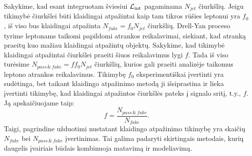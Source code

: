 \documentclass[a4paper, 12pt, oneside]{article}
\newcommand{\Lumi}{{\cal L}_\mathrm{int}}
\newlength\q
\begin{document}
Sakykime, kad esant integruotam šviesiui $\Lumi$ pagaminama $N_{jet}$ čiurkšlių.
Jeigu tikimybė čiurkšlei būti klaidingai atpažintai kaip tam tikros rūšies leptonui yra $f_0$, iš viso bus klaidingai atpažinta
$N_{fake}=f_0 N_{jet}$ čiurkšlių.
Drell-Yan proceso tyrime leptonams taikomi papildomi atrankos reikalavimai, siekiant, kad atranką praeitų kuo
mažiau klaidingai atpažintų objektų.
Sakykime, kad tikimybė klaidingai atpažintai čiurkšlei praeiti šiuos reikalavimus lygi $f$.
Tada iš viso turėsime $N_{pass \,\&\, fake}=ff_0 N_{jet}$ čiurkšlių, kurios gali praeiti analizėje taikomus leptono
atrankos reikalavimus.
Tikimybę $f_0$ eksperimentiškai įvertinti yra sudėtinga, bet taikant klaidingo atpažinimo metodą ji išsiprastina ir lieka
įvertinti tikimybę, kad klaidingai atpažintos čiurkšlės pateks į signalo sritį, t.y., $f$.
Ją apskaičiuojame taip:
\begin{equation}
\label{eq:FRtheor}
	f = \frac{N_{pass \,\&\, fake}}{N_{fake}} .
\end{equation}
Taigi, pagrindine užduotimi nustatant klaidingo atpažinimo tikimybę yra skaičių $N_{fake}$ bei $N_{pass \,\&\, fake}$ įvertinimas.
Tai galima padaryti skirtingais metodais, kurių daugelis įvairiais būdais kombinuoja matavimą ir modeliavimą.
\end{document}
